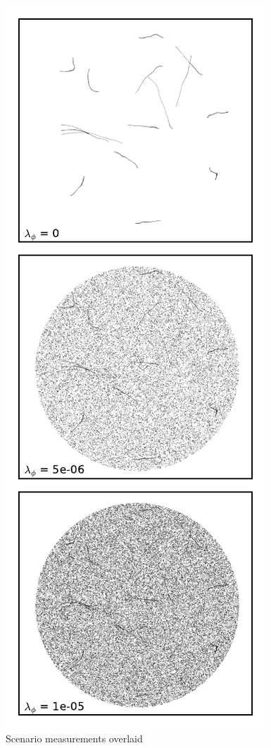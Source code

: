 \begin{figure}
 \centering
 \includegraphics{Figures/plots/ScenarioOverlaid.pdf}
 \caption{Scenario measurements overlaid}\label{fig:measurements_overlaid}
\end{figure}

